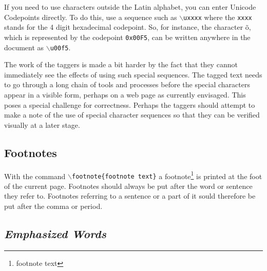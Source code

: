 \documentclass[11pt]{article}
\newcommand{\cmd}[1]{{\tt $\backslash$#1}}
\begin{document}
If you need to use characters outside the Latin alphabet, you can
enter Unicode Codepoints directly. To do this, use a sequence such as
\cmd{uxxxx} where the {\tt xxxx} stands for the 4 digit hexadecimal
codepoint. So, for instance, the character \~o, which is represented
by the codepoint {\tt 0x00F5}, can be written anywhere in the document
as \cmd{u00f5}.

The work of the taggers is made a bit harder by the fact that they
cannot immediately see the effects of using such special
sequences. The tagged text needs to go through a long chain of tools
and processes before the special characters appear in a visible form,
perhaps on a web page as currently envisaged. This poses a special
challenge for correctness.  Perhaps the taggers should attempt to make
a note of the use of special character sequences so that they can be
verified visually at a later stage.



\subsection{Footnotes}

With the command \cmd{footnote\{footnote text\}} a
footnote\footnote{footnote text} is printed at the foot of the current
page. Footnotes should always be put after the word or sentence they
refer to. Footnotes referring to a sentence or a part of it sould
therefore be put after the comma or period.



\subsection{\emph{Emphasized Words}}
\end{document}
